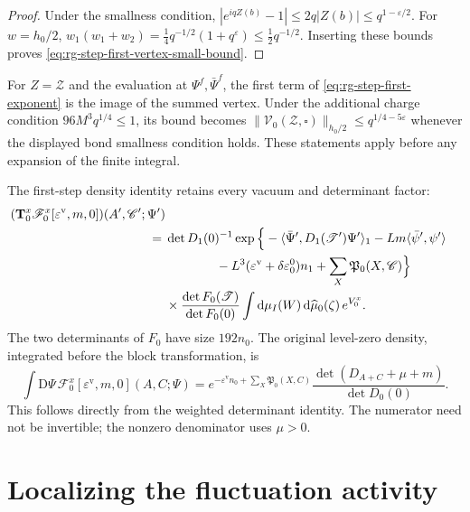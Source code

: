 \documentclass[11pt,letterpaper,reqno]{amsart}
\newcommand{\dd}{\mathrm d}
\begin{document}
\begin{proof}
Under the smallness condition,
$|e^{iqZ(b)}-1|\le2q|Z(b)|\le q^{1-\varepsilon/2}$.
For $w=h_0/2$,
$w_1(w_1+w_2)=\frac14q^{-1/2}(1+q^\varepsilon)
\le\frac12q^{-1/2}$. Inserting these bounds proves
\eqref{eq:rg-step-first-vertex-small-bound}.
\end{proof}

For $Z=\mathscr Z$ and the evaluation at
$\Psi^f,\bar\Psi^f$, the first term of
\eqref{eq:rg-step-first-exponent} is the image of
the summed vertex. Under the additional charge
condition $96M^3q^{1/4}\le1$, its bound becomes
$\|\mathcal V_0(\mathscr Z,\square)\|_{h_0/2}
\le q^{1/4-5\varepsilon}$ whenever the displayed
bond smallness condition holds. These statements
apply before any expansion of the finite integral.

The first-step density identity retains every
vacuum and determinant factor:
\begin{equation}\label{eq:rg-step-first-density}
 \begin{split}
 (\mathbf T_0^x\mathscr F_0^x[\varepsilon^{\mathrm v},m,0])
                                    (A',\mathscr C';\Psi')\\
  ={}&\det D_1(0)^{-1}
       \exp\Big\{-\langle\bar\Psi',D_1(\mathscr T')\Psi'\rangle_1
                   -Lm\langle\bar\psi',\psi'\rangle\\
      &\hspace{14mm}
                   -L^3(\varepsilon^{\mathrm v}
                        +\delta\varepsilon_0^0)n_1
                   +\sum_X\mathfrak P_0(X,\mathscr C)\Big\}\\
       &\times
              \frac{\det F_0(\mathscr T)}{\det F_0(0)}
        \int\dd\mu_I(W)\,\dd\widehat\mu_0(\zeta)\,e^{V_0^x}.
 \end{split}
\end{equation}
The two determinants of $F_0$ have size $192n_0$.
The original level-zero density, integrated before
the block transformation, is
\begin{equation}\label{eq:rg-step-initial-integrated-density}
 \int\mathrm D\Psi\,\mathscr F_0^x
                     [\varepsilon^{\mathrm v},m,0](A,C;\Psi)
     =e^{-\varepsilon^{\mathrm v}n_0+\sum_X\mathfrak P_0(X,C)}
               \frac{\det(D_{A+C}+\mu+m)}{\det D_0(0)}.
\end{equation}
This follows directly from the weighted determinant
identity. The numerator need not be invertible;
the nonzero denominator uses $\mu>0$.


\section{Localizing the fluctuation activity}\label{sec:rg-nonlinear-step}
\end{document}
